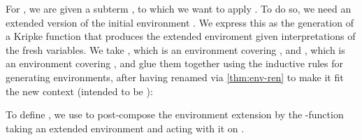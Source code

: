 
For , we are given a subterm , to
which we want to apply .  To do so, we need an
extended version of the initial environment \AgdaBound{$\rho$}. We
express this as the generation of a Kripke function that produces the
extended enviroment given interpretations of the fresh variables. We
take \AgdaBound{$\rho$}, which is an environment covering
\AgdaBound{$\Delta$}, and \AgdaBound{$\sigma$}, which is an
environment covering \AgdaBound{$\Theta$}, and glue them together
using the inductive rules for generating environments, after having
renamed \AgdaBound{$\rho$} via \cref{thm:env-ren} to make it fit the
new context \AgdaBound{$\Gamma^+$} (intended to be
):


To define , we use  to
post-compose the environment extension by the
\AgdaSymbol{$\lambda$}-function taking an extended environment and
acting with it on .


